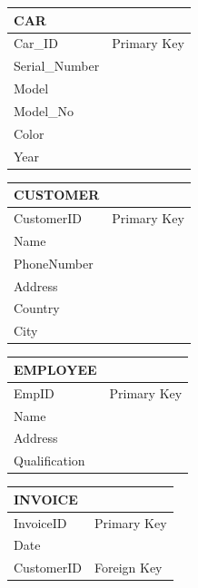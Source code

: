 \noindent
\begin{minipage}[t]{.5\linewidth}
    \centering
    \begin{tabular}{ll}
        \toprule
        \textbf{CAR} & \\
        \midrule
        Car\_ID & Primary Key \\
        Serial\_Number & \\
        Model & \\
        Model\_No & \\
        Color & \\
        Year & \\
        \bottomrule
    \end{tabular}
\end{minipage}%
\begin{minipage}[t]{.5\linewidth}
    \centering
    \begin{tabular}{ll}
        \toprule
        \textbf{CUSTOMER} & \\
        \midrule
        CustomerID & Primary Key \\
        Name & \\
        PhoneNumber & \\
        Address & \\
        Country & \\
        City & \\
        \bottomrule
    \end{tabular}
\end{minipage}


\noindent
\begin{minipage}[t]{.5\linewidth}
    \centering
    \begin{tabular}{ll}
        \toprule
        \textbf{EMPLOYEE} & \\
        \midrule
        EmpID & Primary Key \\
        Name & \\
        Address & \\
        Qualification & \\
        \bottomrule
    \end{tabular}
\end{minipage}%
\begin{minipage}[t]{.5\linewidth}
    \centering
    \begin{tabular}{ll}
        \toprule
        \textbf{INVOICE} & \\
        \midrule
        InvoiceID & Primary Key \\
        Date & \\
        CustomerID & Foreign Key \\
        \bottomrule
    \end{tabular}
\end{minipage}%

